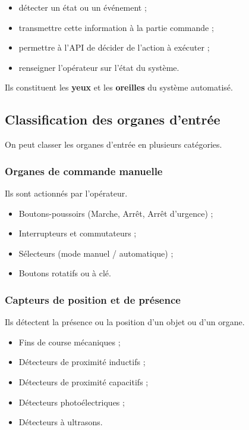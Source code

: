 \begin{itemize}
    \item détecter un état ou un événement ;
    \item transmettre cette information à la partie commande ;
    \item permettre à l'API de décider de l'action à exécuter ;
    \item renseigner l'opérateur sur l'état du système.
\end{itemize}

Ils constituent les \textbf{yeux} et les \textbf{oreilles} du système automatisé.

\subsection{Classification des organes d'entrée}

On peut classer les organes d'entrée en plusieurs catégories.

\subsubsection{Organes de commande manuelle}

Ils sont actionnés par l'opérateur.

\begin{itemize}
    \item Boutons-poussoirs (Marche, Arrêt, Arrêt d'urgence) ;
    \item Interrupteurs et commutateurs ;
    \item Sélecteurs (mode manuel / automatique) ;
    \item Boutons rotatifs ou à clé.
\end{itemize}

\subsubsection{Capteurs de position et de présence}

Ils détectent la présence ou la position d'un objet ou d'un organe.

\begin{itemize}
    \item Fins de course mécaniques ;
    \item Détecteurs de proximité inductifs ;
    \item Détecteurs de proximité capacitifs ;
    \item Détecteurs photoélectriques ;
    \item Détecteurs à ultrasons.
\end{itemize}


